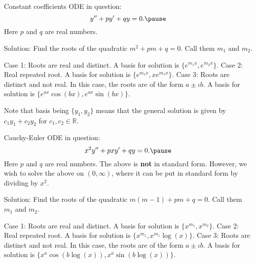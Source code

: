 \documentclass[dvipsnames, handout]{beamer}
\theoremstyle{definition}
\begin{document}
\begin{frame}{Constant coefficients}
  ODE in question:
  \begin{equation*} 
    y'' + p y' + qy = 0. \pause
  \end{equation*}
  Here $p$ and $q$ are real numbers. \pause 

  Solution: Find the roots of the quadratic $m^{2} + pm + q = 0$. \pause Call them $m_{1}$ and $m_{2}$. \pause

  Case 1: Roots are real and distinct. \pause A basis for solution is $\{e^{m_{1} x}, e^{m_{2} x}\}$. \pause \newline
  Case 2: Real repeated root. \pause A basis for solution is $\{e^{m_{1} x}, x e^{m_{1} x}\}$. \pause \newline
  Case 3: Roots are distinct and not real. \pause In this case, the roots are of the form $a \pm \iota b$. \pause A basis for solution is $\{e^{a x} \cos(bx), e^{a x} \sin(bx)\}$. \pause
  
  Note that basis being $\{y_{1}, y_{2}\}$ means that the general solution is given by $c_{1} y_{1} + c_{2} y_{2}$ for $c_{1}, c_{2} \in \mathbb{R}$.
\end{frame}
\begin{frame}{Cauchy-Euler}
  ODE in question:
  \begin{equation*} 
    x^{2} y'' + p xy' + qy = 0. \pause
  \end{equation*}
  Here $p$ and $q$ are real numbers. \pause The above is \textbf{not} in standard form. \pause However, we wish to solve the above on $(0, \infty)$, where it can be put in standard form by dividing by $x^{2}$. \pause

  Solution: Find the roots of the quadratic $m(m - 1) + pm + q = 0$. \pause Call them $m_{1}$ and $m_{2}$. \pause

  Case 1: Roots are real and distinct. \pause A basis for solution is $\{x^{m_{1}}, x^{m_{2}}\}$. \pause \newline
  Case 2: Real repeated root. \pause A basis for solution is $\{x^{m_{1}}, x^{m_{1}} \log(x)\}$. \pause \newline
  Case 3: Roots are distinct and not real. \pause In this case, the roots are of the form $a \pm \iota b$. \pause A basis for solution is $\{x^{a} \cos(b \log(x)), x^{a} \sin(b \log(x))\}$.
\end{frame}
\end{document}
